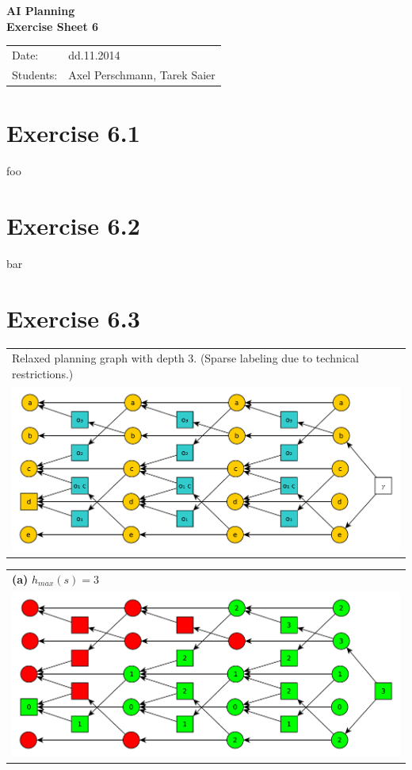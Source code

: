 \documentclass[11pt,a4paper]{article}
\begin{document}
\begin{center}
\Huge{\textbf{AI Planning}}\\
\LARGE{\textbf{Exercise Sheet 6}}
\end{center}
\vspace{2cm}
\begin{tabular}{ll}
Date: & dd.11.2014\\
Students: & Axel Perschmann, Tarek Saier
\end{tabular}

\section*{Exercise 6.1}
foo

\section*{Exercise 6.2}
bar

\section*{Exercise 6.3}
\begin{tabular}{l} %
Relaxed planning graph with depth 3. (Sparse labeling due to technical restrictions.)\\
\includegraphics[scale=0.5]{g63}\\
\end{tabular}

\begin{tabular}{l} %
\textbf{(a)} $h_{max}(s)=3$\\
\includegraphics[scale=0.5]{g63a}\\
\end{tabular}
\end{document}
